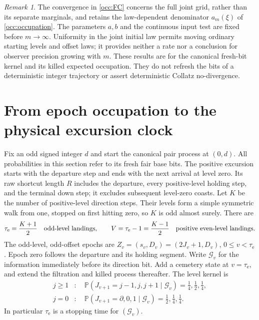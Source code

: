 \documentclass[11pt]{amsart}
\theoremstyle{definition}
\theoremstyle{remark}
\newtheorem{remark}[theorem]{Remark}
\newcommand{\PP}{\mathbb P}
\begin{document}
\begin{remark}\label{occ:scope}
The convergence in \eqref{occ:FC} concerns the full joint grid, rather
than its separate marginals, and retains the law-dependent denominator
$a_m(\xi)$ of \eqref{occ:occupation}.  The parameters $a,b$ and the continuous input
test are fixed before $m\to\infty$.  Uniformity in the joint initial law
permits moving ordinary starting levels and offset laws; it provides neither
a rate nor a conclusion for observer precision growing with $m$.  These results are
for the canonical fresh-bit kernel and its killed expected occupation.
They do not refresh the bits of a deterministic integer trajectory or
assert deterministic Collatz no-divergence.
\end{remark}

\section{From epoch occupation to the physical excursion clock}
\label{clk:section}

Fix an odd signed integer $d$ and start the canonical pair process at
$(0,d)$. All probabilities in this section refer to its fresh fair base
bits. The positive excursion starts with the departure step and ends with
the next arrival at level zero. Its raw shortcut length $R$ includes the
departure, every positive-level holding step, and the terminal down step;
it excludes subsequent level-zero coasts. Let $K$ be the number of
positive-level direction steps. Their levels form a simple symmetric walk
from one, stopped on first hitting zero, so $K$ is odd almost surely. There
are
\begin{equation}\label{clk:counts}
 \tau_{\mathrm e}=\frac{K+1}{2}\quad\hbox{odd-level landings},\qquad
 V=\tau_{\mathrm e}-1=\frac{K-1}{2}\quad\hbox{positive even-level landings}.
\end{equation}
The odd-level, odd-offset epochs are
$Z_v=(s_v,D_v)=(2J_v+1,D_v)$, $0\le v<\tau_{\mathrm e}$. Epoch zero follows
the departure and its holding segment. Write $\mathcal G_v$ for the
information immediately before its direction bit. Add a cemetery state at
$v=\tau_{\mathrm e}$, and extend the filtration and killed process thereafter. The level
kernel is
\begin{equation}\label{clk:killed}
 \begin{split}
 j\ge1 &: \quad \PP(J_{v+1}=j-1,j,j+1\mid\mathcal G_v)
                    =\tfrac14,\tfrac12,\tfrac14,\\
 j=0 &: \quad \PP(J_{v+1}=\partial,0,1\mid\mathcal G_v)
                    =\tfrac12,\tfrac14,\tfrac14.
 \end{split}
\end{equation}
In particular $\tau_{\mathrm e}$ is a stopping time for $(\mathcal G_v)$.
\end{document}
